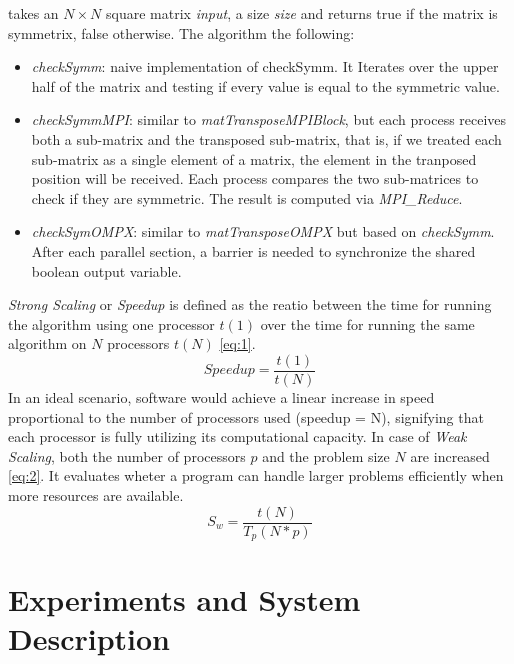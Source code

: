 \documentclass[conference]{IEEEtran}
\begin{document}
takes an $N \times N$ square matrix \textit{input}, a size \textit{size}
and returns true if the matrix is symmetrix, false otherwise.
The algorithm the following:
\begin{itemize}
\item \textit{checkSymm}: naive implementation of checkSymm. It
Iterates over the upper half of the matrix and testing if every value
is equal to the symmetric value.
\item \textit{checkSymmMPI}: similar to \textit{matTransposeMPIBlock},
but each process receives both a sub-matrix and the transposed sub-matrix,
that is, if we treated each sub-matrix as a single element of a matrix,
the element in the tranposed position will be received. Each process
compares the two sub-matrices to check if they are symmetric. The
result is computed
via \textit{MPI\_Reduce}.
\item \textit{checkSymOMPX}: similar to \textit{matTransposeOMPX} but
based on \textit{checkSymm}. After each parallel section, a barrier
is needed to synchronize the shared boolean output variable.
\end{itemize}

\textit{Strong Scaling} or \textit{Speedup} is defined as the reatio
between the time for running the algorithm using one processor $t(1)$ over
the time for running the same algorithm on $N$ processors $t(N)$ \ref{eq:1}.
\begin{equation} \label{eq:1}
Speedup = \frac{t(1)}{t(N)}
\end{equation}
In an ideal scenario, software would achieve a linear increase in
speed proportional to the number of processors used (speedup = N),
signifying that each processor is fully utilizing its computational
capacity.
In case of \textit{Weak Scaling}, both the number of processors $p$
and the problem size $N$ are increased \ref{eq:2}. It evaluates wheter a program
can handle larger problems efficiently when more resources are available.
\begin{equation} \label{eq:2}
S_w = \frac{t(N)}{T_p(N*p)}
\end{equation}


\section{Experiments and System Description}

\end{document}
